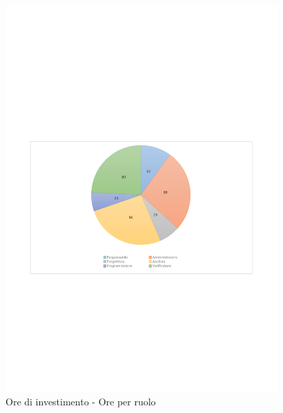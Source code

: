 \documentclass[../PianoProgetto.tex]{subfiles}
\begin{document}
	\begin{figure}[H]
		\centering
		\includegraphics[width=0.93\textwidth , trim=1.5cm 9cm 1.5cm 9cm]{grafici/Riepilogo/Investimento/ore-ruolo}
			\caption{Ore di investimento - Ore per ruolo}
		\label{fig:CircleChart-investimento_ore_r}
	\end{figure}
\vfill	
\newpage
\end{document}
